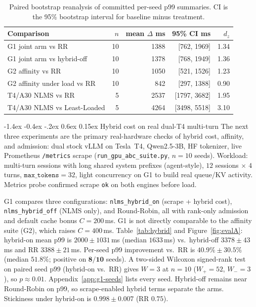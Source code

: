 \documentclass[pdflatex,sn-mathphys-num]{sn-jnl}
\makeatletter
\renewcommand{\subsection}{\@startsection{subsection}{2}{\z@}%
  {-1.4ex \@plus -0.4ex \@minus -.2ex}%
  {0.6ex \@plus 0.15ex}%
  {\needspace{3.5\baselineskip}\normalfont\normalsize\bfseries}}%
\makeatother
\begin{document}
\begin{table}[ht]
\caption{Paired bootstrap reanalysis of committed per-seed p99 summaries. CI is
the 95\% bootstrap interval for baseline minus treatment.}
\label{tab:bootstrap}
\centering
\footnotesize
\begin{tabular}{@{}lrrrr@{}}
\toprule
Comparison & $n$ & mean $\Delta$ ms & 95\% CI ms & $d_z$ \\
\midrule
G1 joint arm vs RR & 10 & 1388 & [762, 1969] & 1.34 \\
G1 joint arm vs hybrid-off & 10 & 1378 & [768, 1949] & 1.36 \\
G2 affinity vs RR & 10 & 1050 & [521, 1526] & 1.23 \\
G2 affinity under load vs RR & 10 & 842 & [297, 1388] & 0.90 \\
T4/A30 NLMS vs RR & 5 & 2537 & [1797, 3682] & 1.95 \\
T4/A30 NLMS vs Least-Loaded & 5 & 4264 & [3498, 5518] & 3.10 \\
\bottomrule
\end{tabular}
\end{table}

\subsection{Hybrid cost on real dual-T4 multi-turn}
\label{sec:evalA}
The next three experiments are the primary real-hardware checks of hybrid cost,
affinity, and admission: dual stock vLLM on Tesla~T4, Qwen2.5-3B, HF tokenizer, live
Prometheus \texttt{/metrics} scrape (\texttt{run\_gpu\_abc\_suite.py}, $n{=}10$ seeds).
Workload: multi-turn sessions with long shared system prefixes (agent-style),
$12$ sessions $\times$ $4$ turns, $\texttt{max\_tokens}{=}32$, light concurrency on G1
to build real queue/KV activity. Metrics probe confirmed scrape \texttt{ok} on both
engines before load.

G1 compares three configurations: \texttt{nlms\_hybrid\_on} (scrape + hybrid cost),
\texttt{nlms\_hybrid\_off} (NLMS only), and Round-Robin, all with rank-only admission
and default cache bonus $C{=}200$\,ms. G1 is not directly comparable to the affinity
suite (G2), which raises $C{=}400$\,ms. Table~\ref{tab:hybrid} and
Figure~\ref{fig:evalA}: hybrid-on mean p99 is $2000\pm1031$\,ms (median $1633$\,ms)
vs.\ hybrid-off $3378\pm43$\,ms and RR $3388\pm21$\,ms. Per-seed p99 improvement vs.\
RR is $\mathbf{40.9\%\pm30.5\%}$ (median $\mathbf{51.8\%}$; positive on
$\mathbf{8/10}$ seeds). A two-sided Wilcoxon signed-rank test on paired seed p99
(hybrid-on vs.\ RR) gives $W{=}3$ at $n{=}10$ ($W_+{=}52$, $W_-{=}3$), so
$p{\approx}0.01$. Appendix~\ref{app:g1-seeds} lists every seed. Hybrid-off remains
near Round-Robin on p99, so scrape-enabled hybrid terms separate the arms.
Stickiness under hybrid-on is $0.998\pm0.007$ (RR $0.75$).
\end{document}
